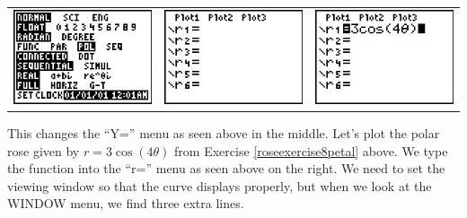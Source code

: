 \documentclass{ximera}
\begin{document}
\begin{center}

\begin{tabular}{ccc}

\includegraphics[width=1.8in]{./PolarGraphsGraphics/Polar01.jpg} &
\hspace{0.05in} \includegraphics[width=1.8in]{./PolarGraphsGraphics/Polar02.jpg} & 
\hspace{0.05in} \includegraphics[width=1.8in]{./PolarGraphsGraphics/Polar03.jpg} \\

\end{tabular} 

\end{center}

This changes the ``Y='' menu as seen above in the middle.  Let's plot the polar rose given by $r = 3\cos(4\theta)$ from Exercise \ref{roseexercise8petal} above. We type the function into the ``r='' menu as seen above on the right.  We need to set the viewing window so that the curve displays properly, but when we look at the WINDOW menu, we find three extra lines.
\end{document}

